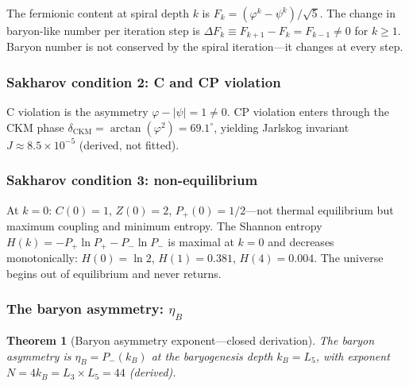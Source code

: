 \documentclass[12pt,a4paper]{article}
\newtheorem{theorem}{Theorem}[section]
\begin{document}
The fermionic content at spiral depth $k$ is $F_k = (\varphi^k - \psi^k)/\sqrt{5}$. The change in baryon-like number per iteration step is $\Delta F_k \equiv F_{k+1} - F_k = F_{k-1} \neq 0$ for $k \geq 1$. Baryon number is not conserved by the spiral iteration---it changes at every step.

\subsubsection{Sakharov condition 2: C and CP violation}

C violation is the asymmetry $\varphi - |\psi| = 1 \neq 0$. CP violation enters through the CKM phase $\delta_{\mathrm{CKM}} = \arctan(\varphi^2) = 69.1^\circ$, yielding Jarlskog invariant $J \approx 8.5 \times 10^{-5}$ (derived, not fitted).

\subsubsection{Sakharov condition 3: non-equilibrium}

At $k = 0$: $C(0) = 1$, $Z(0) = 2$, $P_+(0) = 1/2$---not thermal equilibrium but maximum coupling and minimum entropy.  The Shannon entropy $H(k) = -P_+\ln P_+ - P_-\ln P_-$ is maximal at $k=0$ and decreases monotonically: $H(0) = \ln 2$, $H(1) = 0.381$, $H(4) = 0.004$.  The universe begins out of equilibrium and never returns.

\subsubsection{The baryon asymmetry: $\eta_B$}

\begin{theorem}[Baryon asymmetry exponent---closed derivation]
\label{thm:baryon-exponent}
The baryon asymmetry is $\eta_B = P_-(k_B)$ at the baryogenesis depth $k_B = L_5$, with exponent $N = 4 k_B = L_3 \times L_5 = 44$ (derived).
\end{theorem}
\end{document}
